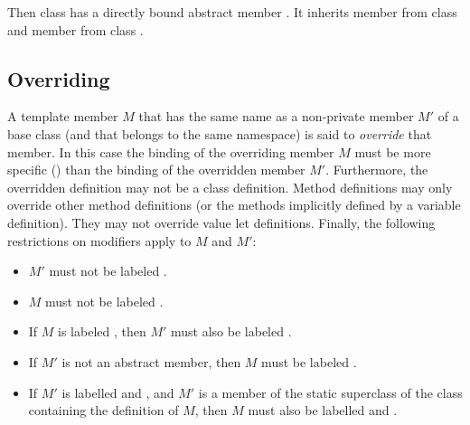 \documentclass[a4paper,12pt,twoside,titlepage]{book}
\newcommand{\ifqualified}[1]{}
\begin{document}
Then class  has a directly bound abstract member . It
inherits member  from class  and member  from
class .

\ifqualified{
\example\label{ex:compound-b}
Consider the definitions:
\begin{lstlisting}
qualified class Root extends Any with { def r1: Root, r2: Int }
qualified class A extends Root with { def r1: A, a: String }
qualified class B extends A with { def r1: B, b: Double }
\end{lstlisting}
Then ~\lstinline@A with B@~ has members
\lstinline@Root::r1@ of type \code{B}, \lstinline@Root::r2@ of type \code{Int},
\lstinline@A::a:@ of type \code{String}, and \lstinline@B::b@ of type \code{Double},
in addition to the members inherited from class \code{Any}.
}

\subsection{Overriding}
\label{sec:overriding}

A template member $M$ that has the same \ifqualified{qualified}
name as a non-private member $M'$ of a base class (and that
belongs to the same namespace) is said to {\em override} that member.
In this case the binding of the overriding member $M$ must be
more specific () than the binding of the
overridden member $M'$.  Furthermore, the overridden definition
may not be a class definition.  Method definitions may only override
other method definitions (or the methods implicitly defined by a
variable definition). They may not override value let definitions.
Finally, the following restrictions on modifiers apply to $M$ and
$M'$:
\begin{itemize}
\item
$M'$ must not be labeled .
\item
$M$ must not be labeled .
\item
If $M$ is labeled , then $M'$ must also be
labeled .
\item
If $M'$ is not an abstract member, then
$M$ must be labeled .
\item
If $M'$ is labelled  and , and $M'$ is a
member of the static superclass of the class containing the definition
of $M$, then $M$ must also be labelled  and
.
\end{itemize}
\end{document}
